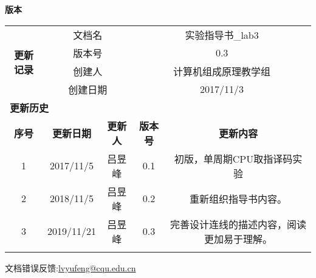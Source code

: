 \textbf{版本}

\begin{table}[htbp]
    \centering
    \begin{tabular}{|c|c|c|c|c|}
        \hline
        \multirow{4}{*}{\textbf{更新记录}} & \multicolumn{2}{c|}{文档名} & \multicolumn{2}{c|}{实验指导书\_lab3} \\
        \cline{2-5} & \multicolumn{2}{c|}{版本号} & \multicolumn{2}{c|}{0.3} \\
        \cline{2-5} & \multicolumn{2}{c|}{创建人} & \multicolumn{2}{c|}{计算机组成原理教学组} \\
        \cline{2-5} & \multicolumn{2}{c|}{创建日期} & \multicolumn{2}{c|}{2017/11/3} \\
        \hline
        \multicolumn{5}{|l|}{\textbf{更新历史}} \\
        \hline
        \textbf{序号} & \textbf{更新日期} & \textbf{更新人} & \textbf{版本号} & \textbf{更新内容} \\
        \hline 
        1 & 2017/11/5 & 吕昱峰 & 0.1 & 初版，单周期CPU取指译码实验\\
        \hline
        2 & 2018/11/5 & 吕昱峰 & 0.2 & 重新组织指导书内容。\\
        \hline
        3 & 2019/11/21 & 吕昱峰 & 0.3 & 完善设计连线的描述内容，阅读更加易于理解。\\
        \hline
         & & & & \\
        \hline
    \end{tabular}
    \label{tab:guide_book_version}
\end{table}


文档错误反馈:\url{lvyufeng@cqu.edu.cn}